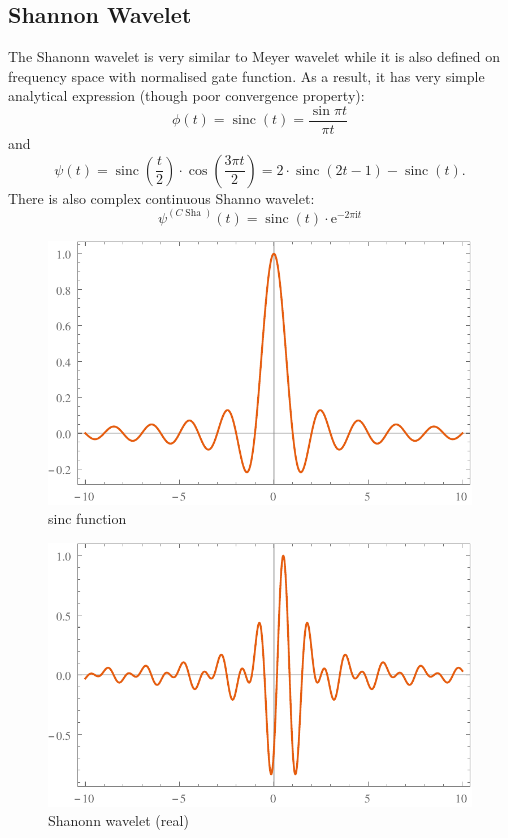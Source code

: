 \documentclass{book}
\newcommand{\mathe}{\mathrm{e}}
\newcommand{\mathi}{\mathrm{i}}
\newcommand{\mathpi}{\pi}
\newcommand{\tmop}[1]{\ensuremath{\operatorname{#1}}}
\begin{document}
\subsection{Shannon Wavelet}

The Shanonn wavelet is very similar to Meyer wavelet while it is also defined
on frequency space with normalised gate function. As a result, it has very
simple analytical expression (though poor convergence property):
\[ \phi (t) = \tmop{sinc} (t) = \frac{\sin \mathpi t}{\mathpi t} \]
and
\[ \psi (t) = \tmop{sinc} \left( \frac{t}{2} \right) \cdot \cos \left( \frac{3
   \mathpi t}{2} \right) = 2 \cdot \tmop{sinc} (2 t - 1) - \tmop{sinc} (t) .
\]
There is also complex continuous Shanno wavelet:
\[ \psi^{(C \tmop{Sha})} (t) = \tmop{sinc} (t) \cdot \mathe^{- 2 \mathpi
   \mathi t} \]
\begin{figure}[h]
  \includegraphics{Figures/ShannonWaveletPhi.pdf}
  \caption{\label{fig:ShanonnPhi}sinc function}
\end{figure}

\begin{figure}[h]
  \includegraphics{Figures/ShannonWaveletPsi.pdf}
  \caption{\label{fig:ShanonnPsi}Shanonn wavelet (real)}
\end{figure}
\end{document}
